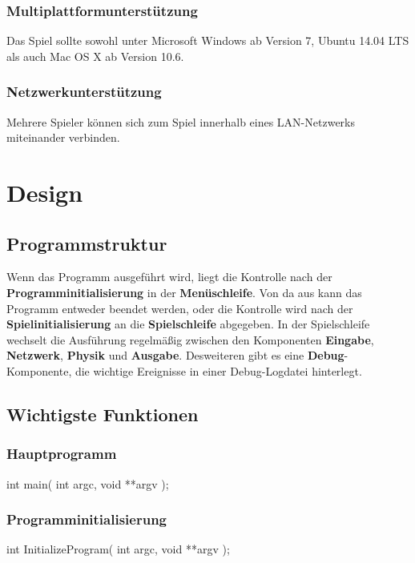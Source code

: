 \documentclass{homework-pp}
\begin{document}
\subsubsection{Multiplattformunterstützung}
Das Spiel sollte sowohl unter Microsoft Windows ab Version 7, Ubuntu 14.04 LTS als auch Mac OS X ab Version 10.6.
\subsubsection{Netzwerkunterstützung}
Mehrere Spieler können sich zum Spiel innerhalb eines LAN-Netzwerks miteinander verbinden.

\section{Design}

\subsection{Programmstruktur}
Wenn das Programm ausgeführt wird, liegt die Kontrolle nach der \textbf{Programminitialisierung} in der \textbf{Menüschleife}. Von da aus kann das Programm entweder beendet werden, oder die Kontrolle wird nach der \textbf{Spielinitialisierung} an die \textbf{Spielschleife} abgegeben. In der Spielschleife wechselt die Ausführung regelmäßig zwischen den Komponenten \textbf{Eingabe}, \textbf{Netzwerk}, \textbf{Physik} und \textbf{Ausgabe}. Desweiteren gibt es eine \textbf{Debug}-Komponente, die wichtige Ereignisse in einer Debug-Logdatei hinterlegt.

\subsection{Wichtigste Funktionen}
\subsubsection{Hauptprogramm}

\begin{cblock}
int main( int argc, void **argv );
\end{cblock}

\subsubsection{Programminitialisierung}

\begin{cblock}
int InitializeProgram( int argc, void **argv );
\end{cblock}
\end{document}
